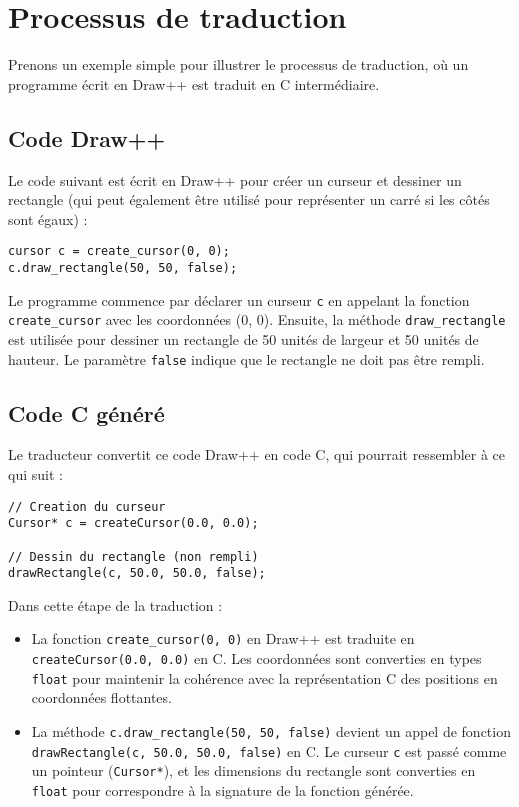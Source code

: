 \documentclass[12pt,a4paper]{report}
\begin{document}
\section{Processus de traduction}
Prenons un exemple simple pour illustrer le processus de traduction, où un programme écrit en Draw++ est traduit en C intermédiaire.

\subsection{Code Draw++}
Le code suivant est écrit en Draw++ pour créer un curseur et dessiner un rectangle (qui peut également être utilisé pour représenter un carré si les côtés sont égaux) :

\begin{lstlisting}[language=Draw++]
cursor c = create_cursor(0, 0);
c.draw_rectangle(50, 50, false);
\end{lstlisting}

Le programme commence par déclarer un curseur \texttt{c} en appelant la fonction \texttt{create\_cursor} avec les coordonnées (0, 0). Ensuite, la méthode \texttt{draw\_rectangle} est utilisée pour dessiner un rectangle de 50 unités de largeur et 50 unités de hauteur. Le paramètre \texttt{false} indique que le rectangle ne doit pas être rempli.

\subsection{Code C généré}
Le traducteur convertit ce code Draw++ en code C, qui pourrait ressembler à ce qui suit :

\begin{lstlisting}[language=Draw++]
// Creation du curseur
Cursor* c = createCursor(0.0, 0.0);

// Dessin du rectangle (non rempli)
drawRectangle(c, 50.0, 50.0, false);
\end{lstlisting}

Dans cette étape de la traduction :
\begin{itemize}
    \item La fonction \texttt{create\_cursor(0, 0)} en Draw++ est traduite en \texttt{createCursor(0.0, 0.0)} en C. Les coordonnées sont converties en types \texttt{float} pour maintenir la cohérence avec la représentation C des positions en coordonnées flottantes.
    \item La méthode \texttt{c.draw\_rectangle(50, 50, false)} devient un appel de fonction \texttt{drawRectangle(c, 50.0, 50.0, false)} en C. Le curseur \texttt{c} est passé comme un pointeur (\texttt{Cursor*}), et les dimensions du rectangle sont converties en \texttt{float} pour correspondre à la signature de la fonction générée.
\end{itemize}
\end{document}
